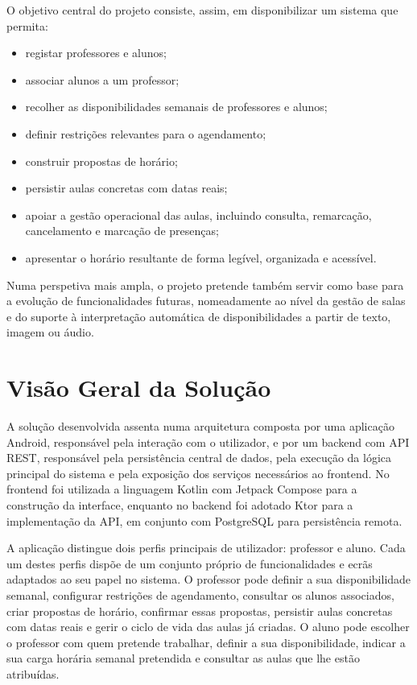 O objetivo central do projeto consiste, assim, em disponibilizar um sistema que permita:

\begin{itemize}
    \item registar professores e alunos;
    \item associar alunos a um professor;
    \item recolher as disponibilidades semanais de professores e alunos;
    \item definir restrições relevantes para o agendamento;
    \item construir propostas de horário;
    \item persistir aulas concretas com datas reais;
    \item apoiar a gestão operacional das aulas, incluindo consulta, remarcação, cancelamento e marcação de presenças;
    \item apresentar o horário resultante de forma legível, organizada e acessível.
\end{itemize}

Numa perspetiva mais ampla, o projeto pretende também servir como base para a evolução de funcionalidades futuras, nomeadamente ao nível da gestão de salas e do suporte à interpretação automática de disponibilidades a partir de texto, imagem ou áudio.

%
%
\section{Visão Geral da Solução} \label{sec12}

A solução desenvolvida assenta numa arquitetura composta por uma aplicação Android, responsável pela interação com o utilizador, e por um backend com API REST, responsável pela persistência central de dados, pela execução da lógica principal do sistema e pela exposição dos serviços necessários ao frontend. No frontend foi utilizada a linguagem Kotlin com Jetpack Compose para a construção da interface, enquanto no backend foi adotado Ktor para a implementação da API, em conjunto com PostgreSQL para persistência remota.

A aplicação distingue dois perfis principais de utilizador: professor e aluno. Cada um destes perfis dispõe de um conjunto próprio de funcionalidades e ecrãs adaptados ao seu papel no sistema. O professor pode definir a sua disponibilidade semanal, configurar restrições de agendamento, consultar os alunos associados, criar propostas de horário, confirmar essas propostas, persistir aulas concretas com datas reais e gerir o ciclo de vida das aulas já criadas. O aluno pode escolher o professor com quem pretende trabalhar, definir a sua disponibilidade, indicar a sua carga horária semanal pretendida e consultar as aulas que lhe estão atribuídas.


